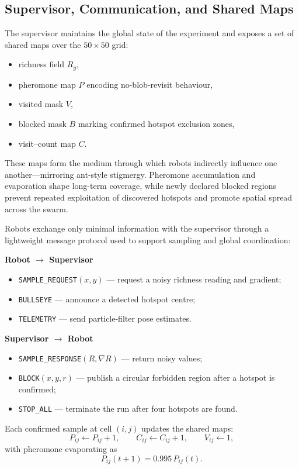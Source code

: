 \documentclass[lettersize,journal]{IEEEtran}
\begin{document}
\subsection{Supervisor, Communication, and Shared Maps 
}

The supervisor maintains the global state of the experiment and exposes a set
of shared maps over the $50{\times}50$ grid:
\begin{itemize}
    \item richness field $R_g$,
    \item pheromone map $P$ encoding no-blob-revisit behaviour,
    \item visited mask $V$,
    \item blocked mask $B$ marking confirmed hotspot exclusion zones,
    \item visit–count map $C$.
\end{itemize}
These maps form the medium through which robots indirectly influence one
another—mirroring ant-style stigmergy. Pheromone accumulation and evaporation
shape long-term coverage, while newly declared blocked regions prevent repeated
exploitation of discovered hotspots and promote spatial spread across the
swarm.

Robots exchange only minimal information with the supervisor through a
lightweight message protocol used to support sampling and global coordination:

\textbf{Robot $\rightarrow$ Supervisor}
\begin{itemize}
    \item \texttt{SAMPLE\_REQUEST}$(x,y)$ — request a noisy richness reading
          and gradient;
    \item \texttt{BULLSEYE} — announce a detected hotspot centre;
    \item \texttt{TELEMETRY} — send particle-filter pose estimates.
\end{itemize}

\textbf{Supervisor $\rightarrow$ Robot}
\begin{itemize}
    \item \texttt{SAMPLE\_RESPONSE}$(R,\nabla R)$ — return noisy values;
    \item \texttt{BLOCK}$(x,y,r)$ — publish a circular forbidden region after a hotspot is confirmed;
    \item \texttt{STOP\_ALL} — terminate the run after four hotspots are found.
\end{itemize}

Each confirmed sample at cell $(i,j)$ updates the shared maps:
\begin{equation}
P_{ij}\leftarrow P_{ij}+1,\qquad
C_{ij}\leftarrow C_{ij}+1,\qquad
V_{ij}\leftarrow 1,
\end{equation}
with pheromone evaporating as
\begin{equation}
P_{ij}(t{+}1) = 0.995\,P_{ij}(t).
\end{equation}
\end{document}
